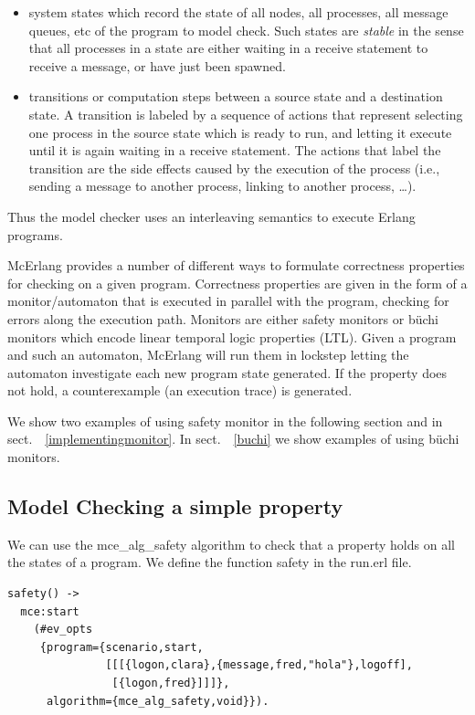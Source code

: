 \documentclass[a4paper]{article}
\newcommand{\algsafetyclassic}{mce\_alg\_safety\xspace}
\begin{document}
\begin{itemize}

\item system states which record the state of all nodes,
  all processes, all message queues, etc of the program to model check. 
  Such states are {\em stable} in the sense that all processes
  in a state are either waiting in a receive statement
  to receive a message, or have just been spawned.

\item transitions or computation steps 
  between a source state and a destination state. A transition is labeled by a
  sequence of actions that represent selecting one process
  in the source state which is ready to run, and letting it execute until 
  it is again waiting in a receive statement. The actions that label the
  transition are the side effects caused by the execution of the process
  (i.e., sending a message to another process, linking to another process,
  \ldots).
\end{itemize}
Thus the model checker uses an interleaving semantics to execute Erlang 
programs.

McErlang provides a number of different ways to formulate correctness
properties for checking on a given program. Correctness properties are
given in the form of a monitor/automaton that is executed in parallel
with the program, checking for errors along the execution
path. Monitors are either safety monitors or b\"{u}chi monitors which
encode linear temporal logic properties (LTL). Given a program and
such an automaton, McErlang will run them in lockstep letting the
automaton investigate each new program state generated.  If the
property does not hold, a counterexample (an execution trace) is
generated.


We show two examples of using safety
monitor in the following section and in
sect.\ ~\ref{implementingmonitor}. In sect.\ ~\ref{buchi} we show
examples of using b\"{u}chi monitors.


\subsection{Model Checking a simple property}

We can use the \algsafetyclassic algorithm to check that a property
holds on all the states of a program. We define the function
safety in the run.erl file.

\begin{verbatim}
safety() ->
  mce:start
    (#ev_opts
     {program={scenario,start,
               [[[{logon,clara},{message,fred,"hola"},logoff],
                [{logon,fred}]]]},
      algorithm={mce_alg_safety,void}}).
\end{verbatim}
\end{document}
